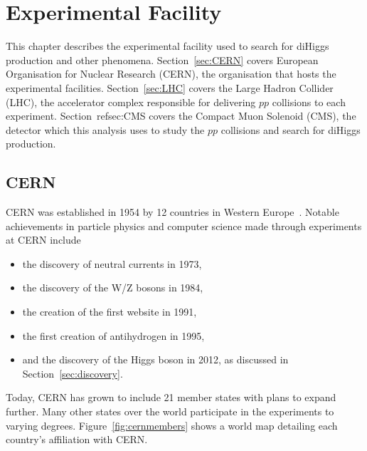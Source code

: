 
\chapter{Experimental Facility\label{ch:experiment}}

This chapter describes the experimental facility used to search for diHiggs production and other phenomena. Section~\ref{sec:CERN} covers European Organisation for Nuclear Research (CERN), the organisation
that hosts the experimental facilities. Section~\ref{sec:LHC} covers the Large Hadron Collider (LHC), the accelerator complex responsible for delivering $pp$ collisions to each experiment. Section~ref{sec:CMS}
covers the Compact Muon Solenoid (CMS), the detector which this analysis uses to study the $pp$ collisions and search for diHiggs production.


\section{CERN\label{sec:CERN}}

CERN was established in 1954 by 12 countries in Western Europe~\cite{cern:public}. Notable
achievements in particle physics and computer science made through experiments at CERN include

\begin{itemize}
\item the discovery of neutral currents in 1973,
\item the discovery of the W/Z bosons in 1984,
\item the creation of the first website in 1991,
\item the first creation of antihydrogen in 1995,
\item and the discovery of the Higgs boson in 2012, as discussed in Section~\ref{sec:discovery}.
\end{itemize}

Today, CERN has grown to include 21 member states with plans to expand further. Many other states
over the world participate in the experiments to varying degrees. Figure~\ref{fig:cernmembers}
shows a world map detailing each country's affiliation with CERN.


